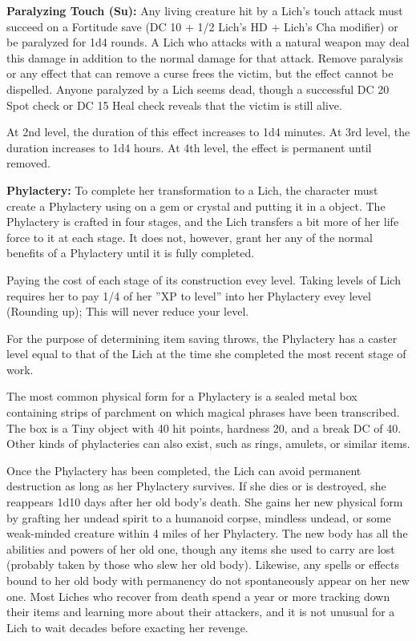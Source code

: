 \textbf{Paralyzing Touch (Su):} Any living creature hit by a Lich's touch attack must succeed on a Fortitude save (DC 10 + 1/2 Lich's HD + Lich's Cha modifier) or be paralyzed for 1d4 rounds. A Lich who attacks with a natural weapon may deal this damage in addition to the normal damage for that attack. Remove paralysis or any effect that can remove a curse frees the victim, but the effect cannot be dispelled. Anyone paralyzed by a Lich seems dead, though a successful DC 20 Spot check or DC 15 Heal check reveals that the victim is still alive.

At 2nd level, the duration of this effect increases to 1d4 minutes. At 3rd level, the duration increases to 1d4 hours. At 4th level, the effect is permanent until removed.

\textbf{Phylactery:} To complete her transformation to a Lich, the character must create a Phylactery using  on a gem or crystal and putting it in a object. The Phylactery is crafted in four stages, and the Lich transfers a bit more of her life force to it at each stage. It does not, however, grant her any of the normal benefits of a Phylactery until it is fully completed.

Paying the cost of each stage of its construction evey level. Taking levels of Lich requires her to pay 1/4 of her ''XP to level'' into her Phylactery evey level (Rounding up); This will never reduce your level.

For the purpose of determining item saving throws, the Phylactery has a caster level equal to that of the Lich at the time she completed the most recent stage of work.

The most common physical form for a Phylactery is a sealed metal box containing strips of parchment on which magical phrases have been transcribed. The box is a Tiny object with 40 hit points, hardness 20, and a break DC of 40. Other kinds of phylacteries can also exist, such as rings, amulets, or similar items.

Once the Phylactery has been completed, the Lich can avoid permanent destruction as long as her Phylactery survives. If she dies or is destroyed, she reappears 1d10 days after her old body's death. She gains her new physical form by grafting her undead spirit to a humanoid corpse, mindless undead, or some weak-minded creature within 4 miles of her Phylactery. The new body has all the abilities and powers of her old one, though any items she used to carry are lost (probably taken by those who slew her old body). Likewise, any spells or effects bound to her old body with permanency do not spontaneously appear on her new one. Most Liches who recover from death spend a year or more tracking down their items and learning more about their attackers, and it is not unusual for a Lich to wait decades before exacting her revenge.


